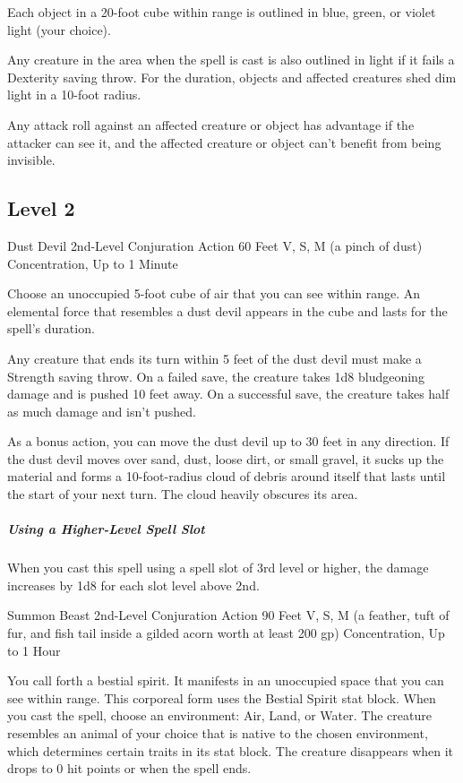 \documentclass[letterpaper,openany,oneside,twocolumn]{book}
\begin{document}
Each object in a 20-foot cube within range is outlined in blue, green, or violet light (your choice).

Any creature in the area when the spell is cast is also outlined in light if it fails a Dexterity saving throw. For the duration, objects and affected creatures shed dim light in a 10-foot radius.

Any attack roll against an affected creature or object has advantage if the attacker can see it, and the affected creature or object can't benefit from being invisible.

\subsection*{Level 2}

\DndSpellHeader
  {Dust Devil}
  {2nd-Level Conjuration}
  {Action}
  {60 Feet}
  {V, S, M (a pinch of dust)}
  {Concentration, Up to 1 Minute}

Choose an unoccupied 5-foot cube of air that you can see within range. An elemental force that resembles a dust devil appears in the cube and lasts for the spell's duration.

Any creature that ends its turn within 5 feet of the dust devil must make a Strength saving throw. On a failed save, the creature takes 1d8 bludgeoning damage and is pushed 10 feet away. On a successful save, the creature takes half as much damage and isn't pushed.

As a bonus action, you can move the dust devil up to 30 feet in any direction. If the dust devil moves over sand, dust, loose dirt, or small gravel, it sucks up the material and forms a 10-foot-radius cloud of debris around itself that lasts until the start of your next turn. The cloud heavily obscures its area.

\subparagraph*{Using a Higher-Level Spell Slot} When you cast this spell using a spell slot of 3rd level or higher, the damage increases by 1d8 for each slot level above 2nd.

\DndSpellHeader
  {Summon Beast}
  {2nd-Level Conjuration}
  {Action}
  {90 Feet}
  {V, S, M (a feather, tuft of fur, and fish tail inside a gilded acorn worth at least 200 gp)}
  {Concentration, Up to 1 Hour}

You call forth a bestial spirit. It manifests in an unoccupied space that you can see within range. This corporeal form uses the Bestial Spirit stat block. When you cast the spell, choose an environment: Air, Land, or Water. The creature resembles an animal of your choice that is native to the chosen environment, which determines certain traits in its stat block. The creature disappears when it drops to 0 hit points or when the spell ends.
\end{document}
